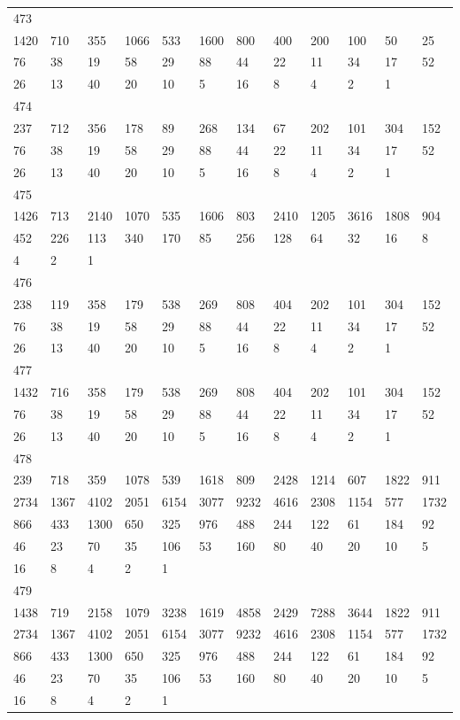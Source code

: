 \begin{longtable}{llllllllllll}
473&&&&&&&&&&&\\
1420& 710& 355& 1066& 533& 1600& 800& 400& 200& 100& 50& 25\\
76& 38& 19& 58& 29& 88& 44& 22& 11& 34& 17& 52\\
26& 13& 40& 20& 10& 5& 16& 8& 4& 2& 1& \\

474&&&&&&&&&&&\\
237& 712& 356& 178& 89& 268& 134& 67& 202& 101& 304& 152\\
76& 38& 19& 58& 29& 88& 44& 22& 11& 34& 17& 52\\
26& 13& 40& 20& 10& 5& 16& 8& 4& 2& 1& \\

475&&&&&&&&&&&\\
1426& 713& 2140& 1070& 535& 1606& 803& 2410& 1205& 3616& 1808& 904\\
452& 226& 113& 340& 170& 85& 256& 128& 64& 32& 16& 8\\
4& 2& 1& \\

476&&&&&&&&&&&\\
238& 119& 358& 179& 538& 269& 808& 404& 202& 101& 304& 152\\
76& 38& 19& 58& 29& 88& 44& 22& 11& 34& 17& 52\\
26& 13& 40& 20& 10& 5& 16& 8& 4& 2& 1& \\

477&&&&&&&&&&&\\
1432& 716& 358& 179& 538& 269& 808& 404& 202& 101& 304& 152\\
76& 38& 19& 58& 29& 88& 44& 22& 11& 34& 17& 52\\
26& 13& 40& 20& 10& 5& 16& 8& 4& 2& 1& \\

478&&&&&&&&&&&\\
239& 718& 359& 1078& 539& 1618& 809& 2428& 1214& 607& 1822& 911\\
2734& 1367& 4102& 2051& 6154& 3077& 9232& 4616& 2308& 1154& 577& 1732\\
866& 433& 1300& 650& 325& 976& 488& 244& 122& 61& 184& 92\\
46& 23& 70& 35& 106& 53& 160& 80& 40& 20& 10& 5\\
16& 8& 4& 2& 1& \\

479&&&&&&&&&&&\\
1438& 719& 2158& 1079& 3238& 1619& 4858& 2429& 7288& 3644& 1822& 911\\
2734& 1367& 4102& 2051& 6154& 3077& 9232& 4616& 2308& 1154& 577& 1732\\
866& 433& 1300& 650& 325& 976& 488& 244& 122& 61& 184& 92\\
46& 23& 70& 35& 106& 53& 160& 80& 40& 20& 10& 5\\
16& 8& 4& 2& 1& \\


\end{longtable}
